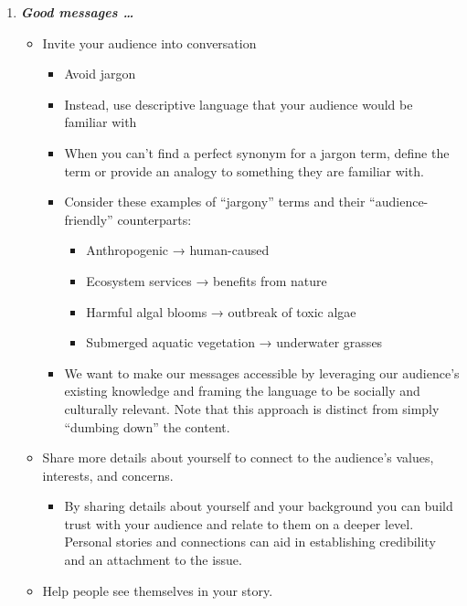 \documentclass[
]{book}
\providecommand{\tightlist}{%
  \setlength{\itemsep}{0pt}\setlength{\parskip}{0pt}}
\begin{document}
\begin{enumerate}
\def\labelenumi{\arabic{enumi}.}
\setcounter{enumi}{1}
\item
  \textbf{\emph{Good messages \ldots{}}}

  \begin{itemize}
  \item
    Invite your audience into conversation

    \begin{itemize}
    \tightlist
    \item
      Avoid jargon
    \item
      Instead, use descriptive language that your audience would be familiar with
    \item
      When you can't find a perfect synonym for a jargon term, define the term or provide an analogy to something they are familiar with.
    \item
      Consider these examples of ``jargony'' terms and their ``audience-friendly'' counterparts:

      \begin{itemize}
      \tightlist
      \item
        Anthropogenic → human-caused
      \item
        Ecosystem services → benefits from nature
      \item
        Harmful algal blooms → outbreak of toxic algae
      \item
        Submerged aquatic vegetation → underwater grasses
      \end{itemize}
    \item
      We want to make our messages accessible by leveraging our audience's existing knowledge and framing the language to be socially and culturally relevant. Note that this approach is distinct from simply ``dumbing down'' the content.
    \end{itemize}
  \item
    Share more details about yourself to connect to the audience's values, interests, and concerns.

    \begin{itemize}
    \tightlist
    \item
      By sharing details about yourself and your background you can build trust with your audience and relate to them on a deeper level. Personal stories and connections can aid in establishing credibility and an attachment to the issue.
    \end{itemize}
  \item
    Help people see themselves in your story.


\end{itemize}
\end{enumerate}
\end{document}
